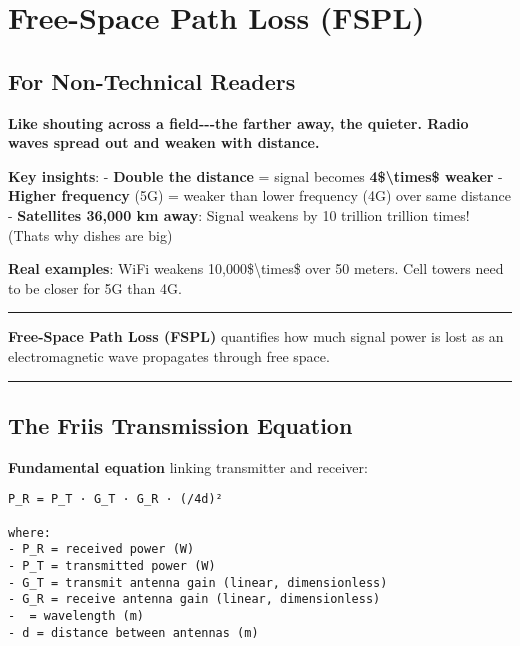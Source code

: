 \section{Free-Space Path Loss (FSPL)}\label{free-space-path-loss-fspl}

\subsection{\texorpdfstring{ For Non-Technical
Readers}{ For Non-Technical Readers}}\label{for-non-technical-readers}

\textbf{Like shouting across a field-\/-\/-the farther away, the
quieter. Radio waves spread out and weaken with distance.}

\textbf{Key insights}: - \textbf{Double the distance} = signal becomes
\textbf{4\$\textbackslash times\$ weaker} - \textbf{Higher frequency}
(5G) = weaker than lower frequency (4G) over same distance -
\textbf{Satellites 36,000 km away}: Signal weakens by 10 trillion
trillion times! (That\textquotesingle s why dishes are big)

\textbf{Real examples}: WiFi weakens 10,000\$\textbackslash times\$ over
50 meters. Cell towers need to be closer for 5G than 4G.

\begin{center}\rule{0.5\linewidth}{0.5pt}\end{center}

\textbf{Free-Space Path Loss (FSPL)} quantifies how much signal power is
lost as an electromagnetic wave propagates through free space.

\begin{center}\rule{0.5\linewidth}{0.5pt}\end{center}

\subsection{\texorpdfstring{ The Friis Transmission
Equation}{ The Friis Transmission Equation}}\label{the-friis-transmission-equation}

\textbf{Fundamental equation} linking transmitter and receiver:

\begin{verbatim}
P_R = P_T · G_T · G_R · (/4d)²

where:
- P_R = received power (W)
- P_T = transmitted power (W)
- G_T = transmit antenna gain (linear, dimensionless)
- G_R = receive antenna gain (linear, dimensionless)
-  = wavelength (m)
- d = distance between antennas (m)
\end{verbatim}

